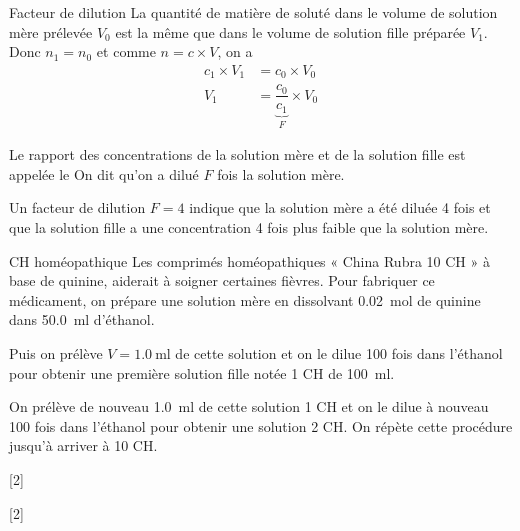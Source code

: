 \begin{doc}{Facteur de dilution}
  La quantité de matière de soluté dans le volume de solution mère prélevée $V_0$ est la même que dans le volume de solution fille préparée $V_1$. Donc $n_1 = n_0$ et comme $n = c \times V$, on a
  \begin{align*}
    c_1 \times V_1 &= c_0 \times V_0 \\
    V_1 &= \underbrace{\dfrac{c_0}{c_1}}_{F} \times V_0
  \end{align*}

  \begin{importants}  
    Le rapport des concentrations de la solution mère et de la solution fille est appelée le 
    On dit qu'on a dilué $F$ fois la solution mère.
  \end{importants}
  \exemple Un facteur de dilution $F = 4$ indique que la solution mère a été diluée 4 fois et que la solution fille a une concentration 4 fois plus faible que la solution mère.
\end{doc}

\begin{doc}{CH homéopathique}
  Les comprimés homéopathiques « China Rubra 10 CH » à base de quinine, aiderait à soigner certaines fièvres.
  Pour fabriquer ce médicament, on prépare une solution mère en dissolvant \qty{0,02}{\mole} de quinine %
  dans \qty{50,0}{\ml} d’éthanol.
  
  Puis on prélève $V = \qty{1,0}{\ml}$ de cette solution et on le dilue 100 fois dans l’éthanol pour obtenir une première solution fille notée 1 CH de \qty{100}{\ml}.
  
  On prélève de nouveau \qty{1,0}{\ml} de cette solution 1 CH et on le dilue à nouveau 100 fois dans l'éthanol pour obtenir une solution 2 CH.
  On répète cette procédure jusqu'à arriver à 10 CH.
\end{doc}

[2]

[2]

